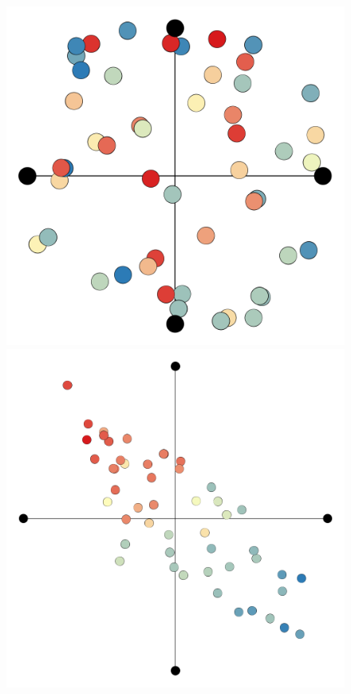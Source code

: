 \documentclass[11pt]{article}
\begin{document}
\begin{figure}[htp!]
  \includegraphics[width=\linewidth]{images/Evolutions/WB_0.png}
\endminipage\hfill
{}
\centering
  \includegraphics[width=\linewidth]{images/Evolutions/WB_0300_02.png}

\end{figure}
\end{document}
